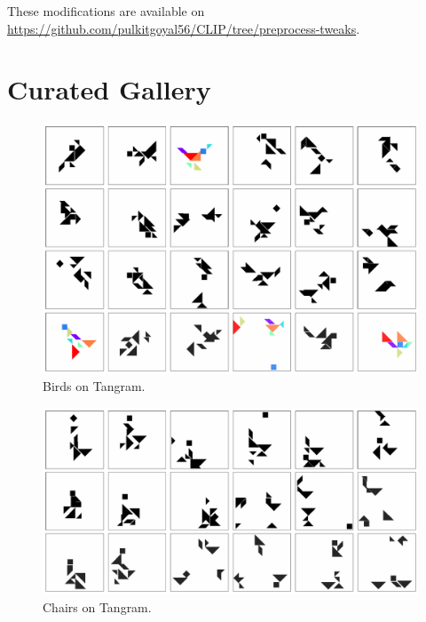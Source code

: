 These modifications are available on \url{https://github.com/pulkitgoyal56/CLIP/tree/preprocess-tweaks}.


\chapter{Curated Gallery}
\label{sec:gallery}

\begin{figure}[h]
    \centering
    \includegraphics[width=\textwidth]{images/curation_bird.pdf}
    \caption{Birds on Tangram.}
    \label{fig:curation_bird}
\end{figure}

\begin{figure}[h]
    \centering
    \includegraphics[width=\textwidth]{images/curation_chair.pdf}
    \caption{Chairs on Tangram.}
    \label{fig:curation_chair}
\end{figure}

